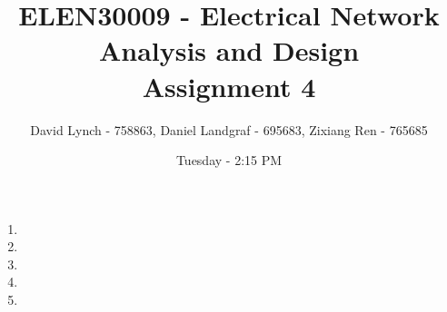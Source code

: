 \documentclass[10pt,a4paper]{article}
\author{David Lynch - 758863, Daniel Landgraf - 695683, Zixiang Ren - 765685}
\title{\huge{ELEN30009 - Electrical Network Analysis and Design \\ Assignment 4}}
\date{Tuesday - 2:15 PM}
\begin{document}
\maketitle

	\begin{enumerate}
		\item{
		\let\clearpage\relax
		
		}
		\item{
		\let\clearpage\relax
		
		}
		\item{
		\let\clearpage\relax
		
		}
		\item{
		\let\clearpage\relax
		
		}
		\item{
		\let\clearpage\relax
		
		}
		
	\end{enumerate}
\end{document}
